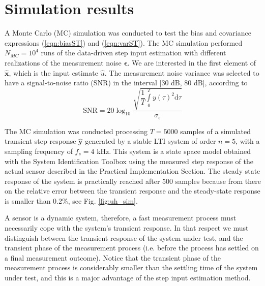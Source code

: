 \section{Simulation results} 

A Monte Carlo (MC) simulation was conducted to test the bias and covariance expressions (\ref{eqn:biasST}) and (\ref{eqn:varST}).
The MC simulation performed $N_{MC} = 10^4$ runs of the data-driven step input estimation with different realizations of the measurement noise $\bm{\epsilon}$.
We are interested in the first element of $\widehat{\mathbf{x}}$, which is the input estimate $\widehat{u}$.
The measurement noise variance was selected to have a signal-to-noise ratio (SNR) in the interval [30 dB, 80 dB], according to
\begin{equation} \mathrm{SNR} = 20 \log_{10}{ \dfrac{ \sqrt{ \dfrac{1}{T} \int\limits_{0}^{T}{ y(\tau)^2  \mathrm{d} \tau } } }{ \sigma_{ \epsilon }} } \end{equation} 

The MC simulation was conducted processing $T = 5000$ samples of a simulated transient step response $\widehat{\mathbf{y}}$ generated by a stable LTI system of order $n = 5$, with a sampling frequency of $f_s=4$ kHz.
This system is a state space model obtained with the System Identification Toolbox using the measured step response of the actual sensor described in the Practical Implementation Section.
The steady state response of the system is practically reached after 500 samples because from there on the relative error between the transient response and the steady-state response is smaller than 0.2\%, see Fig. \ref{fig:uh_sim}.

A sensor is a dynamic system, therefore, a fast measurement process must necessarily cope with the system’s transient response. In that respect we must distinguish between the transient response of the system under test, and the transient phase of the measurement process (i.e. before the process has settled on a final measurement outcome). Notice that the transient phase of the measurement process is considerably smaller than the settling time of the system under test, and this is a major advantage of the step input estimation method.

